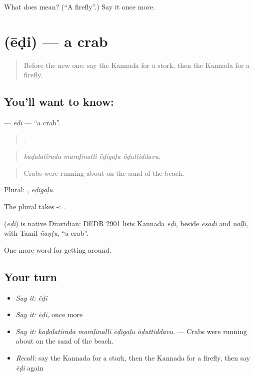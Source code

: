 \begin{tcolorbox}[breakable,colback=teal!4,colframe=teal!35!black,title={Before you move on}]
What does  mean? (\textquotedblleft{}A firefly\textquotedblright{}.) Say it once more.
\end{tcolorbox}
\section[\texorpdfstring{\kn{ಏಡಿ} (ēḍi)}{ಏಡಿ (ēḍi)}]{ (ēḍi) — a crab}

\label{lesson:KA-C478-edi}



\begin{quote}
Before the new one: say the Kannada for a stork, then the Kannada for a firefly.
\end{quote}

\subsection*{You'll want to know: }
\textbf{} — \emph{ēḍi} — \textquotedblleft{}a crab\textquotedblright{}.

\begin{quote}
   .
\end{quote}

\begin{quote}
\emph{kaḍalatīrada maraḷinalli ēḍigaḷu ōḍuttiddavu.}
\end{quote}

\begin{quote}
Crabs were running about on the sand of the beach.
\end{quote}

Plural: , \emph{ēḍigaḷu}.

The plural takes -: .

\begin{cousinweb}
\textbf{} (\emph{ēḍi}) is native Dravidian: DEDR 2901 lists Kannada \emph{ēḍi}, beside \emph{esaḍi} and \emph{naḷḷi}, with Tamil \emph{ñaṇṭu}, \textquotedblleft{}a crab\textquotedblright{}.
\end{cousinweb}

\begin{grammarlens}[title={What you've built}]
One more word for getting around.
\end{grammarlens}

\subsection*{Your turn}
\begin{itemize}
\raggedright
  \item \emph{Say it:} \emph{ēḍi}
  \item \emph{Say it:} \emph{ēḍi}, once more
  \item \emph{Say it:} \emph{kaḍalatīrada maraḷinalli ēḍigaḷu ōḍuttiddavu.} — Crabs were running about on the sand of the beach.
  \item \emph{Recall:} say the Kannada for a stork, then the Kannada for a firefly, then say \emph{ēḍi} again
\end{itemize}

